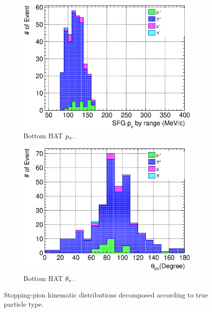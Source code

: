 \begin{figure}
               \\
               \begin{subfigure}{\dbfigwid\textwidth}
                    \includegraphics[width=\textwidth]{figures/sel/sspi_BOT_pi_mombr_stack_al6_zoom.eps}
                    \caption{Bottom HAT $p_{\pi}$.}
                    \label{subfig:sppi-bot-ppi}
               \end{subfigure}
               \begin{subfigure}{\dbfigwid\textwidth}
                    \includegraphics[width=\textwidth]{figures/sel/sspi_BOT_theta_trk_stack_al6_zoom.eps}
                    \caption{Bottom HAT $\theta_{\pi}$.}
                    \label{subfig:sppi-bot-tpi}
               \end{subfigure}
               \caption{Stopping-pion kinematic distributions decomposed according to true particle type.}
               \label{fig:sppi-kin}
          \end{figure}

